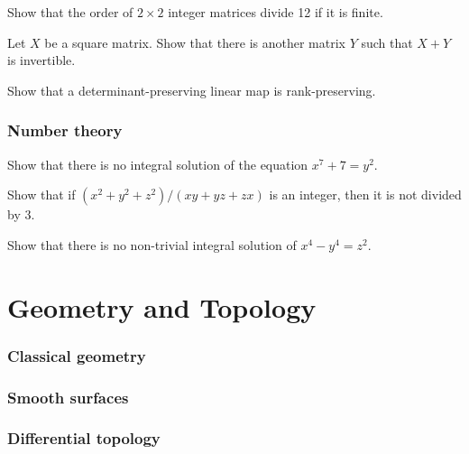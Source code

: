 \documentclass[12pt]{article}
\begin{document}
	\begin{prb}
	Show that the order of $2\times 2$ integer matrices divide 12 if it is finite.
	\end{prb}

	\begin{prb}
	Let $X$ be a square matrix. Show that there is another matrix $Y$ such that $X+Y$ is invertible.
	\end{prb}

	\begin{prb}
	Show that a determinant-preserving linear map is rank-preserving.
	\end{prb}






\section{Number theory}
	\begin{prb}
	Show that there is no integral solution of the equation $x^7+7=y^2$.
	\end{prb}

	\begin{prb}
	Show that if $(x^2+y^2+z^2)/(xy+yz+zx)$ is an integer, then it is not divided by 3.
	\end{prb}
	
	\begin{prb}
	Show that there is no non-trivial integral solution of $x^4-y^4=z^2$.
	\end{prb}








\newpage
\part{Geometry and Topology}
\setcounter{section}{0}

\section{Classical geometry}

\section{Smooth surfaces}

\section{Differential topology}
\end{document}
